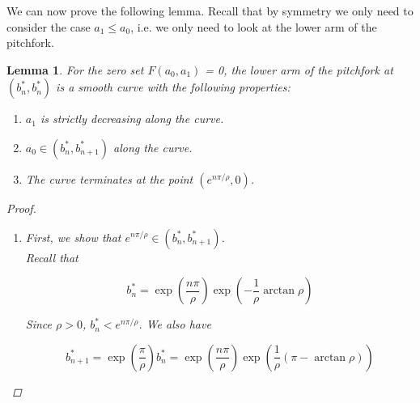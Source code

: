 \documentclass[12pt]{article}
\newtheorem{lemma}{Lemma}
\begin{document}
We can now prove the following lemma. Recall that by symmetry we only need to consider the case $a_1 \leq a_0$, i.e. we only need to look at the lower arm of the pitchfork.


\begin{lemma}
For the zero set $F(a_0, a_1)$ = 0, the lower arm of the pitchfork at $(b_n^*, b_n^*)$ is a smooth curve with the following properties:

\begin{enumerate}
\item $a_1$ is strictly decreasing along the curve.
\item $a_0 \in (b_n^*, b_{n+1}^*)$ along the curve.
\item The curve terminates at the point $(e^{n \pi/\rho}, 0)$.
\end{enumerate}

\begin{proof}

\begin{enumerate}

We will look at the lower arm of the pitchfork bifurcation at $(a_0, a_1) = (b_n^*, b_n^*)$. From Lemma \ref{pitchfork}, we know what this looks like locally. To be precise, we can find a point $(a_0^*, a_1^*)$ near $(b_n^*, b_n^*)$ with $b_n^* < a_0^* < b_{n-1}^* $ and $0 < a_1^* < b_n^*$ and a smooth curve connecting them so that $F(a_0, a_1) = 0$ along this cure. From the normal form in Lemma \ref{pitchfork}, this curve must lie below and to the right of the bifurcation point $(b_n^*, b_n^*)$. We note in particular that $F(a_0^*, a_1^*) = 0$. We will show in a series of steps that we can continue this curve uniquely until it meets the $a_0$ axis at $(e^{n \pi/\rho}, 0)$.

\item First, we show that $e^{n \pi/\rho} \in (b^*_n, b^*_{n+1})$.\\

Recall that

\begin{equation*}
b^*_n = \exp\left(\frac{n \pi}{\rho} \right) \exp \left( -\frac{1}{\rho} \arctan \rho \right)
\end{equation*}

Since $\rho > 0$, $b^*_n < e^{n \pi/\rho}$. We also have 

\begin{equation*}
b^*_{n+1} = \exp\left(\frac{\pi}{\rho} \right) b^*_n = \exp\left(\frac{n \pi}{\rho} \right) \exp \left( \frac{1}{\rho}(\pi - \arctan \rho)\right)
\end{equation*}


\end{enumerate}
\end{proof}
\end{lemma}
\end{document}
